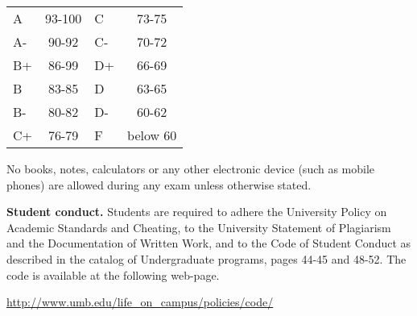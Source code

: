 \documentclass{article}
\begin{document}
\begin{center}
\begin{tabular}{lc|lc}
A & 93-100 & C  & 73-75 \\
A-& 90-92  & C- & 70-72 \\
B+& 86-99  & D+ & 66-69 \\
B & 83-85  & D  & 63-65\\
B-& 80-82  & D- & 60-62\\
C+& 76-79  & F  & below 60\\
\end{tabular}

\end{center}

No books, notes, calculators or any other electronic device (such as mobile phones) are allowed during any exam unless otherwise stated.

\medskip
\noindent \textbf{Student conduct.} Students  are required to adhere the University Policy on Academic Standards and Cheating, to the University Statement of Plagiarism and the Documentation of Written Work, and to the Code of Student Conduct as described in the catalog of Undergraduate programs, pages 44-45 and 48-52. The code is available at the following web-page.

\noindent\url{http://www.umb.edu/life_on_campus/policies/code/}
\end{document}
